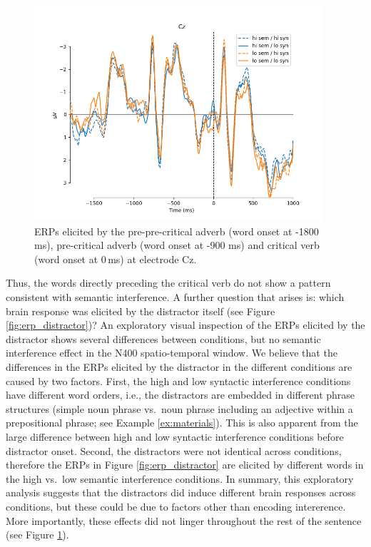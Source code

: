 \documentclass[a4paper, man, floatsintext]{apa7}
\begin{document}
\begin{figure}[H]
    \caption{ERPs elicited by the pre-pre-critical adverb (word onset at -1800 ms), pre-critical adverb (word onset at -900 ms) and critical verb (word onset at 0\,ms) at electrode Cz.}
    \label{fig:erp_precrit}
    \centering
    \includegraphics[width=0.95\textwidth]{images/N_103_Cz_precrit.png}
\end{figure}

Thus, the words directly preceding the critical verb do not show a pattern consistent with semantic interference. A further question that arises is: which brain response was elicited by the distractor itself (see Figure \ref{fig:erp_distractor})? An exploratory visual inspection of the ERPs elicited by the distractor shows several differences between conditions, but no semantic interference effect in the N400 spatio-temporal window. We believe that the differences in the ERPs elicited by the distractor in the different conditions are caused by two factors. First, the high and low syntactic interference conditions have different word orders, i.e., the distractors are embedded in different phrase structures (simple noun phrase vs.\ noun phrase including an adjective within a prepositional phrase; see Example \ref{ex:materials}). This is also apparent from the large difference between high and low syntactic interference conditions before distractor onset. Second, the distractors were not identical across conditions, therefore the ERPs in Figure \ref{fig:erp_distractor} are elicited by different words in the high vs.\ low semantic interference conditions. In summary, this exploratory analysis suggests that the distractors did induce different brain responses across conditions, but these could be due to factors other than encoding intererence. More importantly, these effects did not linger throughout the rest of the sentence (see Figure \ref{fig:erp_precrit}). 
\end{document}
